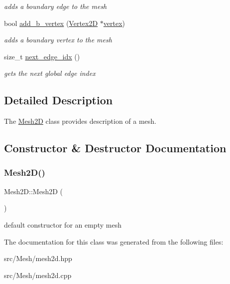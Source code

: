 \begin{DoxyCompactItemize}
\begin{DoxyCompactList}\small\item\em adds a boundary edge to the mesh \end{DoxyCompactList}\item 
bool \hyperlink{group__Mesh2D_gaa56f578853eec0ddba252cb2c0399986}{add\+\_\+b\+\_\+vertex} (\hyperlink{classHArDCore2D_1_1Vertex2D}{Vertex2D} $\ast$\hyperlink{classHArDCore2D_1_1Mesh2D_ac29a7c5c0c36b3aa519520fbb9cf20de}{vertex})
\begin{DoxyCompactList}\small\item\em adds a boundary vertex to the mesh \end{DoxyCompactList}\item 
size\+\_\+t \hyperlink{group__Mesh2D_ga6feb79c0ef575bf4b4b90854dcda8646}{next\+\_\+edge\+\_\+idx} ()
\begin{DoxyCompactList}\small\item\em gets the next global edge index \end{DoxyCompactList}\end{DoxyCompactItemize}


\subsection{Detailed Description}
The \hyperlink{classHArDCore2D_1_1Mesh2D}{Mesh2D} class provides description of a mesh. 

\subsection{Constructor \& Destructor Documentation}
\mbox{\label{classHArDCore2D_1_1Mesh2D_a04b6cd67a13e59ec44be0b19739610e7}} 
\subsubsection{\texorpdfstring{Mesh2\+D()}{Mesh2D()}}
{\footnotesize\ttfamily Mesh2\+D\+::\+Mesh2D (\begin{DoxyParamCaption}{ }\end{DoxyParamCaption})}

default constructor for an empty mesh 

The documentation for this class was generated from the following files\+:\begin{DoxyCompactItemize}
\item 
src/\+Mesh/mesh2d.\+hpp\item 
src/\+Mesh/mesh2d.\+cpp\end{DoxyCompactItemize}
